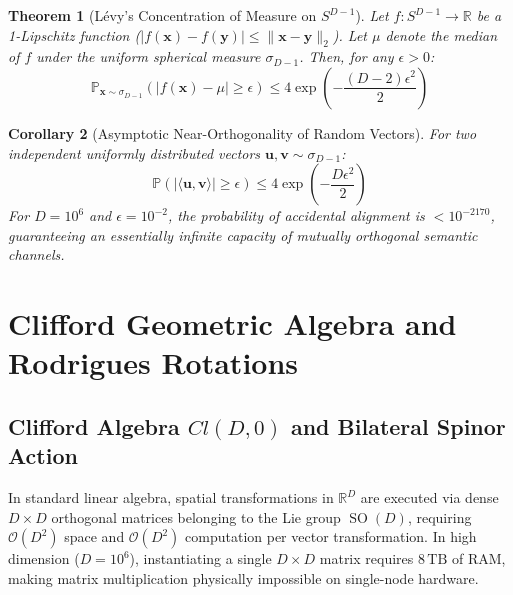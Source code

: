 \documentclass[11pt,twoside,a4paper]{article}
\theoremstyle{plain}
\newtheorem{theorem}{Theorem}[section]
\newtheorem{corollary}[theorem]{Corollary}
\theoremstyle{definition}
\theoremstyle{remark}
\newcommand{\R}{\mathbb{R}}
\newcommand{\SO}{\operatorname{SO}}
\begin{document}
\begin{theorem}[Lévy's Concentration of Measure on $S^{D-1}$]
Let $f: S^{D-1} \to \R$ be a 1-Lipschitz function ($|f(\mathbf{x}) - f(\mathbf{y})| \le \|\mathbf{x} - \mathbf{y}\|_2$). Let $\mu$ denote the median of $f$ under the uniform spherical measure $\sigma_{D-1}$. Then, for any $\epsilon > 0$:
\begin{equation}
\mathbb{P}_{\mathbf{x} \sim \sigma_{D-1}} \left( |f(\mathbf{x}) - \mu| \ge \epsilon \right) \le 4 \exp\left( - \frac{(D-2)\epsilon^2}{2} \right)
\end{equation}
\end{theorem}

\begin{corollary}[Asymptotic Near-Orthogonality of Random Vectors]
For two independent uniformly distributed vectors $\mathbf{u}, \mathbf{v} \sim \sigma_{D-1}$:
\begin{equation}
\mathbb{P}\left( |\langle \mathbf{u}, \mathbf{v} \rangle| \ge \epsilon \right) \le 4 \exp\left( - \frac{D\epsilon^2}{2} \right)
\end{equation}
For $D = 10^6$ and $\epsilon = 10^{-2}$, the probability of accidental alignment is $< 10^{-2170}$, guaranteeing an essentially infinite capacity of mutually orthogonal semantic channels.
\end{corollary}

\section{Clifford Geometric Algebra and Rodrigues Rotations}


\subsection{Clifford Algebra $Cl(D, 0)$ and Bilateral Spinor Action}

In standard linear algebra, spatial transformations in $\R^D$ are executed via dense $D \times D$ orthogonal matrices belonging to the Lie group $\SO(D)$, requiring $\mathcal{O}(D^2)$ space and $\mathcal{O}(D^2)$ computation per vector transformation. In high dimension ($D = 10^6$), instantiating a single $D \times D$ matrix requires $8\,\text{TB}$ of RAM, making matrix multiplication physically impossible on single-node hardware.
\end{document}
